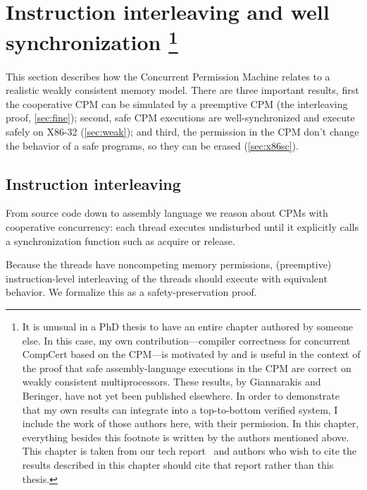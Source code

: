 \chapter[Instruction interleaving and well synchronization]{Instruction interleaving and well synchronization
\ifdefined\techreport
\else
\footnote{It is unusual in a PhD thesis to have an entire chapter authored by someone else.  In this case, my own contribution---compiler correctness for concurrent CompCert based on the CPM---is motivated by and is useful in the context of the proof that safe assembly-language executions in the CPM are correct on weakly consistent multiprocessors. These results, by Giannarakis and Beringer, have not yet been published elsewhere.  In order to demonstrate that my own results can integrate into a top-to-bottom verified system, I include the work of those authors here, with their permission. In this chapter, everything besides this footnote is written by the authors mentioned above. 
This chapter is taken from our tech report \techlink\ and authors who wish to cite the results described in this chapter should cite that report rather than this thesis.
}
\fi
}
\label{sec:asm_proofs}





This section describes how the Concurrent Permission Machine relates to a realistic weakly consistent memory model. There are three important results, 
first the cooperative CPM can be simulated by a preemptive CPM (the interleaving proof, \autoref{sec:fine}); second, safe CPM executions are well-synchronized and execute safely on X86-32 (\autoref{sec:weak}); and third, the permission in the CPM don't change the behavior of a safe programs, so they can be erased (\autoref{sec:x86sc}).





\section{Instruction interleaving}
\label{sec:fine}
From source code down to assembly language we
reason about CPMs with cooperative concurrency: each thread
executes undisturbed until it explicitly calls a
synchronization function such as acquire or release.

Because the threads have noncompeting memory permissions,
(preemptive) instruction-level interleaving of the threads should
execute with equivalent behavior.  We formalize this as a
safety-preservation proof.

